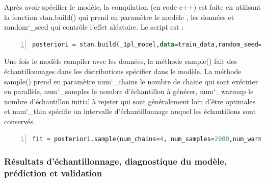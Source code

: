 Après avoir spécifier le modèle, la compilation (en code c++) est faite en utilisant la fonction \colorbox{gray!30}{stan.build()} qui prend en paramètre le modèle , les données et random\char`_seed qui contrôle l’effet aléatoire. Le script est :
\begin{lstlisting}[language=Stan,basicstyle=\small, frame=l,framesep=4.5mm,framexleftmargin=2.5mm,tabsize=2,numbers=left,fillcolor=\color{blueforest!70},rulecolor=\color{blueforest},numberstyle=\normalsize\tiny\color{white}]
	posteriori = stan.build(_1pl_model,data=train_data,random_seed=2021)
\end{lstlisting}

\noindent Une fois le modèle compiler avec les données, la méthode \colorbox{gray!30}{sample()} fait des échantillonnages dans les distributions spécifier dans le modèle. La méthode \colorbox{gray!30}{sample()} prend en paramètre \colorbox{gray!30}{num\char`_chains}   le nombre de chaine  qui sont exécuter en parallèle, \colorbox{gray!30}{num\char`_samples}  le nombre d’échantillon à générer, \colorbox{gray!30}{num\char`_warmup}  le nombre d’échantillon initial à rejeter qui sont généralement loin d'être optimales et \colorbox{gray!30}{num\char`_thin} spécifie un intervalle d'échantillonnage auquel les échantillons sont conservés.

\begin{lstlisting}[language=Stan,basicstyle=\small, frame=l,framesep=4.5mm,framexleftmargin=2.5mm,tabsize=2,numbers=left,fillcolor=\color{blueforest!70},rulecolor=\color{blueforest},numberstyle=\normalsize\tiny\color{white}]
	fit = posteriori.sample(num_chains=4, num_samples=2000,num_warmup=1000,num_thin=1)
\end{lstlisting}


\subsubsection{Résultats d’échantillonnage, diagnostique du modèle, prédiction et validation}


